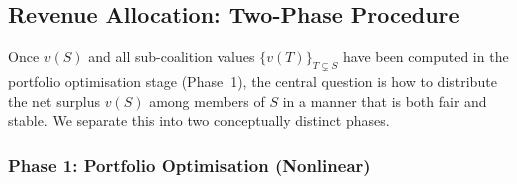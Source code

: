 \documentclass[manuscript, screen, review, anonymous]{acmart}
\begin{document}





\subsection{Revenue Allocation: Two-Phase Procedure}
\label{sec:allocation}

Once $v(S)$ and all sub-coalition values $\{v(T)\}_{T \subsetneq S}$ have been
computed in the portfolio optimisation stage (Phase~1), the central question is
how to distribute the net surplus $v(S)$ among members of $S$ in a manner that
is both fair and stable. We separate this into two conceptually distinct phases.

\subsubsection*{Phase 1: Portfolio Optimisation (Nonlinear)}
\end{document}
